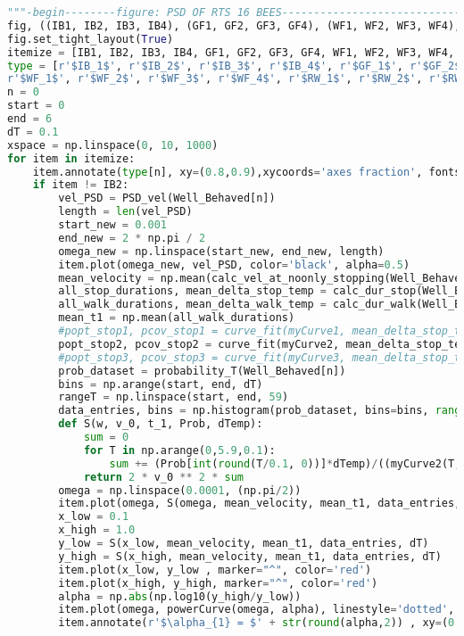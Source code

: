 \begin{lstlisting}[language=Python, basicstyle=\tiny, frame=single, keywordstyle=\color{teal}, commentstyle=\color{olive}, stringstyle=\color{red}]
"""-begin--------figure: PSD OF RTS 16 BEES----------------------------------"""
fig, ((IB1, IB2, IB3, IB4), (GF1, GF2, GF3, GF4), (WF1, WF2, WF3, WF4), (RW1, RW2, RW3, RW4)) = plt.subplots(4, 4, figsize=(10,10))
fig.set_tight_layout(True)
itemize = [IB1, IB2, IB3, IB4, GF1, GF2, GF3, GF4, WF1, WF2, WF3, WF4, RW1, RW2, RW3, RW4]
type = [r'$IB_1$', r'$IB_2$', r'$IB_3$', r'$IB_4$', r'$GF_1$', r'$GF_2$', r'$GF_3$', r'$GF_4$', 
r'$WF_1$', r'$WF_2$', r'$WF_3$', r'$WF_4$', r'$RW_1$', r'$RW_2$', r'$RW_3$', r'$RW_4$']
n = 0
start = 0
end = 6
dT = 0.1
xspace = np.linspace(0, 10, 1000)
for item in itemize:
    item.annotate(type[n], xy=(0.8,0.9),xycoords='axes fraction', fontsize=12)
    if item != IB2:
        vel_PSD = PSD_vel(Well_Behaved[n])
        length = len(vel_PSD)
        start_new = 0.001
        end_new = 2 * np.pi / 2
        omega_new = np.linspace(start_new, end_new, length)
        item.plot(omega_new, vel_PSD, color='black', alpha=0.5)
        mean_velocity = np.mean(calc_vel_at_noonly_stopping(Well_Behaved[n])[0])
        all_stop_durations, mean_delta_stop_temp = calc_dur_stop(Well_Behaved[n])
        all_walk_durations, mean_delta_walk_temp = calc_dur_walk(Well_Behaved[n])
        mean_t1 = np.mean(all_walk_durations)
        #popt_stop1, pcov_stop1 = curve_fit(myCurve1, mean_delta_stop_temp, all_stop_durations, maxfev = 200000, p0=(0,0))
        popt_stop2, pcov_stop2 = curve_fit(myCurve2, mean_delta_stop_temp, all_stop_durations, maxfev = 200000, p0=(0,0))
        #popt_stop3, pcov_stop3 = curve_fit(myCurve3, mean_delta_stop_temp, all_stop_durations, maxfev = 200000, p0=(0,0,0))
        prob_dataset = probability_T(Well_Behaved[n])
        bins = np.arange(start, end, dT)
        rangeT = np.linspace(start, end, 59)
        data_entries, bins = np.histogram(prob_dataset, bins=bins, range=(start,end), density=True)
        def S(w, v_0, t_1, Prob, dTemp):
            sum = 0
            for T in np.arange(0,5.9,0.1):
                sum += (Prob[int(round(T/0.1, 0))]*dTemp)/((myCurve2(T,*popt_stop2)+1)*((1/myCurve2(T,*popt_stop2)+1/t_1)**2+w**2))
            return 2 * v_0 ** 2 * sum
        omega = np.linspace(0.0001, (np.pi/2))
        item.plot(omega, S(omega, mean_velocity, mean_t1, data_entries, dT), linestyle='dashed', color='black')
        x_low = 0.1
        x_high = 1.0
        y_low = S(x_low, mean_velocity, mean_t1, data_entries, dT)
        y_high = S(x_high, mean_velocity, mean_t1, data_entries, dT)
        item.plot(x_low, y_low , marker="^", color='red')
        item.plot(x_high, y_high, marker="^", color='red')
        alpha = np.abs(np.log10(y_high/y_low))
        item.plot(omega, powerCurve(omega, alpha), linestyle='dotted', color='red')
        item.annotate(r'$\alpha_{1} = $' + str(round(alpha,2)) , xy=(0.05,0.9),xycoords='axes fraction', fontsize=12)


\end{lstlisting}
